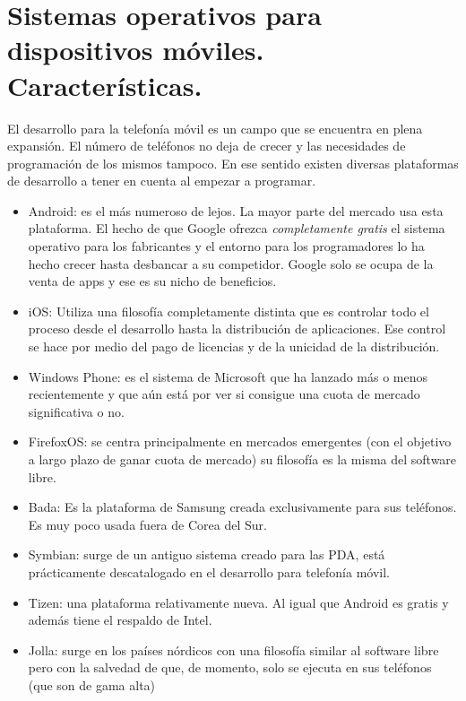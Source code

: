 \documentclass[a4paper,12pt,spanish]{sphinxmanual}
\begin{document}
\section{Sistemas operativos para dispositivos móviles. Características.}
\label{tema1:sistemas-operativos-para-dispositivos-moviles-caracteristicas}
El desarrollo para la telefonía móvil es un campo que se encuentra en plena expansión. El número de teléfonos no deja de crecer y las necesidades de programación de los mismos tampoco. En ese sentido existen diversas plataformas de desarrollo a tener en cuenta al empezar a programar.
\begin{itemize}
\item {} 
Android: es el más numeroso de lejos. La mayor parte del mercado usa esta plataforma. El hecho de que Google ofrezca \emph{completamente gratis} el sistema operativo para los fabricantes y el entorno para los programadores lo ha hecho crecer hasta desbancar a su competidor. Google solo se ocupa de la venta de apps y ese es su nicho de beneficios.

\item {} 
iOS: Utiliza una filosofía completamente distinta que es controlar todo el proceso desde el desarrollo hasta la distribución de aplicaciones. Ese control se hace por medio del pago de licencias y de la unicidad de la distribución.

\item {} 
Windows Phone: es el sistema de Microsoft que ha lanzado más o menos recientemente y que aún está por ver si consigue una cuota de mercado significativa o no.

\item {} 
FirefoxOS: se centra principalmente en mercados emergentes (con el objetivo a largo plazo de ganar cuota de mercado) su filosofía es la misma del software libre.

\item {} 
Bada: Es la plataforma de Samsung creada exclusivamente para sus teléfonos. Es muy poco usada fuera de Corea del Sur.

\item {} 
Symbian: surge de un antiguo sistema creado para las PDA, está prácticamente descatalogado en el desarrollo para telefonía móvil.

\item {} 
Tizen: una plataforma relativamente nueva. Al igual que Android es gratis y además tiene el respaldo de Intel.

\item {} 
Jolla: surge en los países nórdicos con una filosofía similar al software libre pero con la salvedad de que, de momento, solo se ejecuta en sus teléfonos (que son de gama alta)

\end{itemize}
\end{document}
